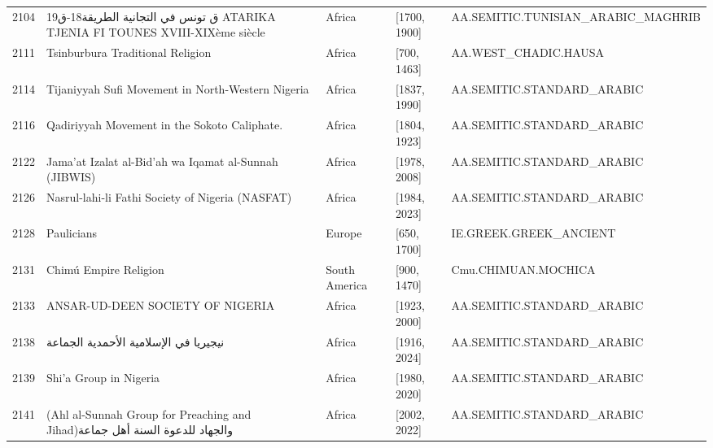 {\begin{longtable}{rp{3.5cm}llp{3.5cm}}
2104 & {\raggedright {\arabicfont ق تونس في التجانية الطريقة}18-{\arabicfont ق}19 ATARIKA TJENIA FI TOUNES  XVIII-XIXème siècle} & Africa & [1700, 1900] & {\raggedright AA.\allowbreak{}SEMITIC.\allowbreak{}TUNISIAN\_\allowbreak{}ARABIC\_\allowbreak{}MAGHRIB} \\
2111 & {\raggedright Tsinburbura Traditional Religion} & Africa & [700, 1463] & {\raggedright AA.\allowbreak{}WEST\_\allowbreak{}CHADIC.\allowbreak{}HAUSA} \\
2114 & {\raggedright Tijaniyyah Sufi Movement in North-Western Nigeria} & Africa & [1837, 1990] & {\raggedright AA.\allowbreak{}SEMITIC.\allowbreak{}STANDARD\_\allowbreak{}ARABIC} \\
2116 & {\raggedright Qadiriyyah Movement in the Sokoto Caliphate.} & Africa & [1804, 1923] & {\raggedright AA.\allowbreak{}SEMITIC.\allowbreak{}STANDARD\_\allowbreak{}ARABIC} \\
2122 & {\raggedright Jama'at Izalat al-Bid'ah wa Iqamat al-Sunnah (JIBWIS)} & Africa & [1978, 2008] & {\raggedright AA.\allowbreak{}SEMITIC.\allowbreak{}STANDARD\_\allowbreak{}ARABIC} \\
2126 & {\raggedright Nasrul-lahi-li Fathi Society of Nigeria (NASFAT)} & Africa & [1984, 2023] & {\raggedright AA.\allowbreak{}SEMITIC.\allowbreak{}STANDARD\_\allowbreak{}ARABIC} \\
2128 & {\raggedright Paulicians} & Europe & [650, 1700] & {\raggedright IE.\allowbreak{}GREEK.\allowbreak{}GREEK\_\allowbreak{}ANCIENT} \\
2131 & {\raggedright Chimú Empire Religion} & South America & [900, 1470] & {\raggedright Cmu.\allowbreak{}CHIMUAN.\allowbreak{}MOCHICA} \\
2133 & {\raggedright ANSAR-UD-DEEN SOCIETY OF NIGERIA} & Africa & [1923, 2000] & {\raggedright AA.\allowbreak{}SEMITIC.\allowbreak{}STANDARD\_\allowbreak{}ARABIC} \\
2138 & {\raggedright {\arabicfont نيجيريا في الإسلامية الأحمدية الجماعة}} & Africa & [1916, 2024] & {\raggedright AA.\allowbreak{}SEMITIC.\allowbreak{}STANDARD\_\allowbreak{}ARABIC} \\
2139 & {\raggedright Shi'a Group in Nigeria} & Africa & [1980, 2020] & {\raggedright AA.\allowbreak{}SEMITIC.\allowbreak{}STANDARD\_\allowbreak{}ARABIC} \\
2141 & {\raggedright (Ahl al-Sunnah Group for Preaching and Jihad){\arabicfont والجهاد للدعوة السنة أهل جماعة}} & Africa & [2002, 2022] & {\raggedright AA.\allowbreak{}SEMITIC.\allowbreak{}STANDARD\_\allowbreak{}ARABIC} \\

\end{longtable}}
